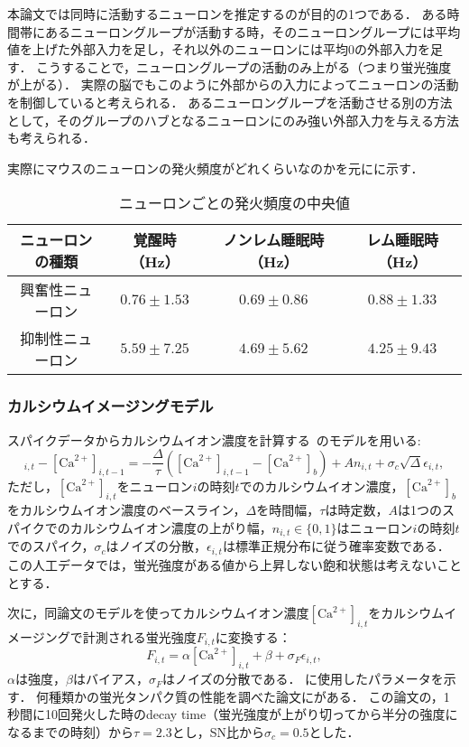 本論文では同時に活動するニューロンを推定するのが目的の1つである．
ある時間帯にあるニューロングループが活動する時，そのニューロングループには平均値を上げた外部入力を足し，それ以外のニューロンには平均$0$の外部入力を足す．
こうすることで，ニューロングループの活動のみ上がる（つまり蛍光強度が上がる）．
実際の脳でもこのように外部からの入力によってニューロンの活動を制御していると考えられる．
あるニューロングループを活動させる別の方法として，そのグループのハブとなるニューロンにのみ強い外部入力を与える方法も考えられる．

実際にマウスのニューロンの発火頻度がどれくらいなのか\cite{Watson2016}を元にに示す．
\begin{table}[htb]
  \center
  \begin{tabular}{|c|ccc|} \hline
    ニューロンの種類 & 覚醒時（Hz） & ノンレム睡眠時（Hz） & レム睡眠時（Hz） \\ \hline
		興奮性ニューロン & $0.76 \pm 1.53$ & $0.69 \pm 0.86$ & $0.88 \pm 1.33$ \\
		抑制性ニューロン & $5.59 \pm 7.25$ & $4.69 \pm 5.62$ & $4.25 \pm 9.43$ \\ \hline
  \end{tabular}
  \caption{ニューロンごとの発火頻度の中央値}
  \label{tab:spike-frequency}
\end{table}

\subsubsection{カルシウムイメージングモデル}
スパイクデータからカルシウムイオン濃度を計算する~\cite{Vogelstein2009}のモデルを用いる:
\begin{equation}
  [\text{Ca}^{2+}]_{i,t} - [\text{Ca}^{2+}]_{i,t-1} = - \frac{\Delta}{\tau}([\text{Ca}^{2+}]_{i,t-1} - [\text{Ca}^{2+}]_b) + An_{i,t} + \sigma_c \sqrt{\Delta} \epsilon_{i,t},
  \label{eq:calcium}
\end{equation}
ただし，$[\text{Ca}^{2+}]_{i,t}$をニューロン$i$の時刻$t$でのカルシウムイオン濃度，$[\text{Ca}^{2+}]_b$をカルシウムイオン濃度のベースライン，$\Delta$を時間幅，$\tau$は時定数，$A$は1つのスパイクでのカルシウムイオン濃度の上がり幅，$n_{i,t} \in \{0,1\}$はニューロン$i$の時刻$t$でのスパイク，$\sigma_c$はノイズの分散，$\epsilon_{i,t}$は標準正規分布に従う確率変数である．
この人工データでは，蛍光強度がある値から上昇しない飽和状態は考えないこととする．

次に，同論文のモデルを使ってカルシウムイオン濃度$[\text{Ca}^{2+}]_{i,t}$をカルシウムイメージングで計測される蛍光強度$F_{i,t}$に変換する：
\begin{equation}
	F_{i,t} = \alpha[\text{Ca}^{2+}]_{i,t} + \beta + \sigma_F \epsilon_{i,t},
  \label{eq:intensity}
\end{equation}
$\alpha$は強度，$\beta$はバイアス，$\sigma_F$はノイズの分散である．
に使用したパラメータを示す．
何種類かの蛍光タンパク質の性能を調べた論文に\cite{Chen2013a}がある．
この論文の，1秒間に10回発火した時のdecay time（蛍光強度が上がり切ってから半分の強度になるまでの時刻）から$\tau = 2.3$とし，SN比から$\sigma_c = 0.5$とした．

